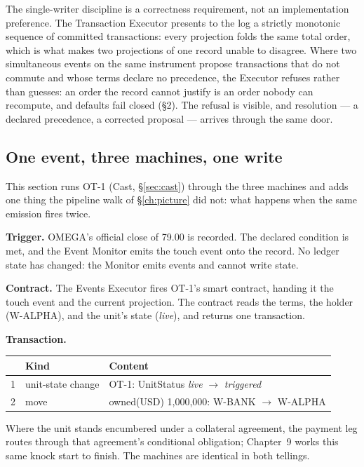 The single-writer discipline is a correctness requirement, not an
implementation preference. The Transaction Executor presents to the log a
strictly monotonic sequence of committed transactions: every projection folds
the same total order, which is what makes two projections of one record unable
to disagree. Where two simultaneous events on the same instrument propose
transactions that do not commute and whose terms declare no precedence, the
Executor refuses rather than guesses: an order the record cannot justify is an
order nobody can recompute, and defaults fail closed (\S2). The refusal is
visible, and resolution --- a declared precedence, a corrected proposal ---
arrives through the same door.

\subsection{One event, three machines, one write}

This section runs OT-1 (Cast, \S\ref{sec:cast}) through the three machines and adds one
thing the pipeline walk of \S\ref{ch:picture} did not: what happens when the same emission
fires twice.

\textbf{Trigger.} OMEGA's official close of 79.00 is recorded. The declared
condition is met, and the Event Monitor emits the touch event onto the record.
No ledger state has changed: the Monitor emits events and cannot write state.

\textbf{Contract.} The Events Executor fires OT-1's smart contract, handing it
the touch event and the current projection. The contract reads the terms, the
holder (\mbox{W-ALPHA}), and the unit's state (\emph{live}), and returns one
transaction.

\textbf{Transaction.}

\begin{center}
\begin{tabular}{@{}rll@{}}
\toprule
 & Kind & Content \\
\midrule
1 & unit-state change & OT-1: UnitStatus \emph{live} $\to$ \emph{triggered} \\
2 & move & owned(USD) 1{,}000{,}000: W-BANK $\to$ W-ALPHA \\
\bottomrule
\end{tabular}
\end{center}

Where the unit stands encumbered under a collateral agreement, the payment leg
routes through that agreement's conditional obligation; Chapter~9 works this
same knock start to finish. The machines are identical in both tellings.

